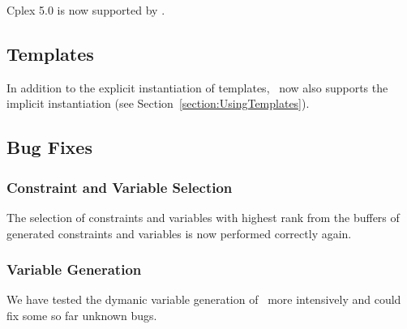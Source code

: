 Cplex 5.0 is now supported by \ABACUS.

\subsection{Templates}

In addition to the explicit instantiation of templates, \ABACUS\ now
also supports the implicit instantiation (see
Section~\ref{section:UsingTemplates}). 


\subsection{Bug Fixes}


\subsubsection{Constraint and Variable Selection}

The selection of constraints and variables with highest rank from the 
buffers of generated constraints and variables is now performed
correctly again.

\subsubsection{Variable Generation}

We have tested the dymanic variable generation of \ABACUS\ more
intensively and could fix some so far unknown bugs.

